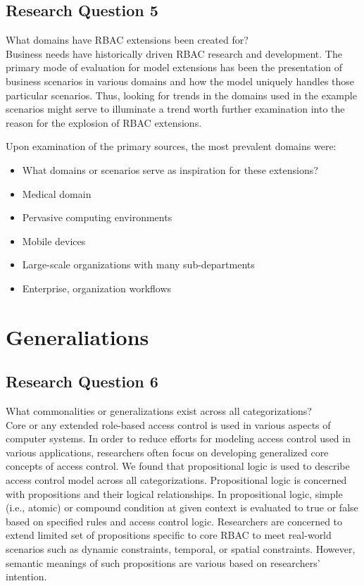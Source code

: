 \subsection{Research Question 5}

What domains have RBAC extensions been created for? \\

Business needs have historically driven RBAC research and development.  The primary mode of evaluation for
model extensions has been the presentation of business scenarios in various domains and how the model
uniquely handles those particular scenarios.  Thus, looking for trends in the domains used in the example
scenarios might serve to illuminate a trend worth further examination into the reason for the explosion of
RBAC extensions.

Upon examination of the primary sources, the most prevalent domains were:

\begin{itemize}
\setlength{\itemsep}{0.25pt}
\item What domains or scenarios serve as inspiration for these extensions?
\item Medical domain
\item Pervasive computing environments
\item Mobile devices
\item Large-scale organizations with many sub-departments
\item Enterprise, organization workflows
\end{itemize}


\section{Generaliations} \label{sec:generalizations}

\subsection{Research Question 6}

What commonalities or generalizations exist across all categorizations? \\

Core or any extended role-based access control is used in various aspects of computer systems. In order to reduce efforts for modeling access control used in various applications, researchers often focus on developing generalized core concepts of access control.
We found that propositional logic is used to describe access control model across all categorizations. Propositional logic is concerned with propositions and their logical relationships. In propositional logic, simple (i.e., atomic) or compound condition at given context is evaluated to true or false based on specified rules and access control logic. Researchers are concerned to extend limited set of propositions specific to core RBAC to meet real-world scenarios such as dynamic constraints, temporal, or spatial constraints. However, semantic meanings of such propositions are various based on researchers' intention.

